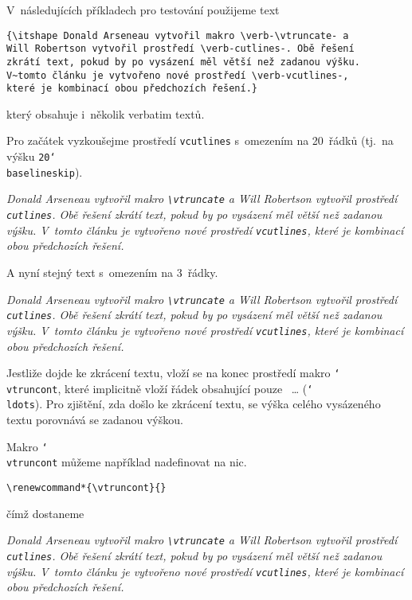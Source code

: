 \documentclass[oldcsbabel]{csbulletin}
\def\p#1{\texttt{\char`\\#1}}
\def\uv#1{\char18 #1\char16 }
\begin{document}
V~následujících příkladech pro testování použijeme text
\begin{Verbatim}
{\itshape Donald Arseneau vytvořil makro \verb-\vtruncate- a
Will Robertson vytvořil prostředí \verb-cutlines-. Obě řešení
zkrátí text, pokud by po vysázení měl větší než zadanou výšku.
V~tomto článku je vytvořeno nové prostředí \verb-vcutlines-,
které je kombinací obou předchozích řešení.}
\end{Verbatim}
\noindent
který obsahuje i~několik verbatim textů.


Pro začátek vyzkoušejme prostředí \texttt{vcutlines} s~omezením na 20~řádků (tj.~na výšku \texttt{20}\p{baselineskip}).

\begin{vcutlines}[20\baselineskip]
{\itshape Donald Arseneau vytvořil makro \verb-\vtruncate- a Will Robertson vytvořil prostředí \verb-cutlines-. Obě řešení zkrátí text, pokud by po vysázení měl větší než zadanou výšku. V~tomto článku je vytvořeno nové prostředí \verb-vcutlines-, které je kombinací obou předchozích řešení.}
\end{vcutlines}

\smallskip

A nyní stejný text s~omezením na 3~řádky.

\begin{vcutlines}[3\baselineskip]
{\itshape Donald Arseneau vytvořil makro \verb-\vtruncate- a Will Robertson vytvořil prostředí \verb-cutlines-. Obě řešení zkrátí text, pokud by po vysázení měl větší než zadanou výšku. V~tomto článku je vytvořeno nové prostředí \verb-vcutlines-, které je kombinací obou předchozích řešení.}
\end{vcutlines}

\smallskip

Jestliže dojde ke zkrácení textu, vloží se na konec prostředí makro \p{vtruncont}, které implicitně vloží řádek obsahující pouze~\uv{\ldots} (\p{ldots}). Pro zjištění, zda došlo ke zkrácení textu, se výška celého vysázeného textu porovnává se zadanou výškou.

\renewcommand*{\vtruncont}{}
Makro \p{vtruncont} můžeme například nadefinovat na nic.
\begin{Verbatim}
\renewcommand*{\vtruncont}{}
\end{Verbatim}
\noindent
čímž dostaneme

\begin{vcutlines}[3\baselineskip]
{\itshape Donald Arseneau vytvořil makro \verb-\vtruncate- a Will Robertson vytvořil prostředí \verb-cutlines-. Obě řešení zkrátí text, pokud by po vysázení měl větší než zadanou výšku. V~tomto článku je vytvořeno nové prostředí \verb-vcutlines-, které je kombinací obou předchozích řešení.}
\end{vcutlines}
\end{document}
